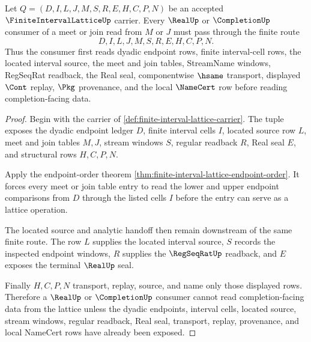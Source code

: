 \begin{theorem}
\label{thm:finite-interval-lattice-real-completion-route}
Let $Q=(D,I,L,J,M,S,R,E,H,C,P,N)$ be an accepted $\FiniteIntervalLatticeUp$ carrier. Every $\RealUp$ or $\CompletionUp$ consumer of a meet or join read from $M$ or $J$ must pass through the finite route
$$
D,I,L,J,M,S,R,E,H,C,P,N .
$$
Thus the consumer first reads dyadic endpoint rows, finite interval-cell rows, the located interval source, the meet and join tables, StreamName windows, RegSeqRat readback, the Real seal, componentwise $\hsame$ transport, displayed $\Cont$ replay, $\Pkg$ provenance, and the local $\NameCert$ row before reading completion-facing data.
\end{theorem}
\begin{proof}
Begin with the carrier of \autoref{def:finite-interval-lattice-carrier}. The tuple exposes the dyadic endpoint ledger $D$, finite interval cells $I$, located source row $L$, meet and join tables $M,J$, stream windows $S$, regular readback $R$, Real seal $E$, and structural rows $H,C,P,N$.

Apply the endpoint-order theorem \autoref{thm:finite-interval-lattice-endpoint-order}. It forces every meet or join table entry to read the lower and upper endpoint comparisons from $D$ through the listed cells $I$ before the entry can serve as a lattice operation.

The located source and analytic handoff then remain downstream of the same finite route. The row $L$ supplies the located interval source, $S$ records the inspected endpoint windows, $R$ supplies the $\RegSeqRatUp$ readback, and $E$ exposes the terminal $\RealUp$ seal.

Finally $H,C,P,N$ transport, replay, source, and name only those displayed rows. Therefore a $\RealUp$ or $\CompletionUp$ consumer cannot read completion-facing data from the lattice unless the dyadic endpoints, interval cells, located source, stream windows, regular readback, Real seal, transport, replay, provenance, and local NameCert rows have already been exposed.
\end{proof}

